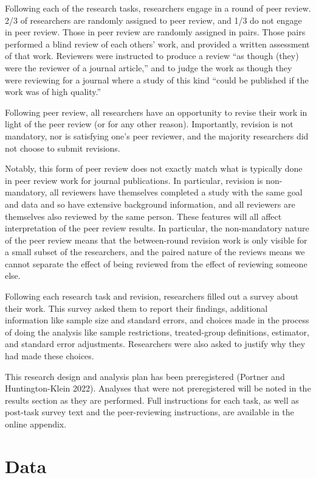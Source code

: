\documentclass[
  letterpaper,
  DIV=11,
  numbers=noendperiod]{scrartcl}
\begin{document}
Following each of the research tasks, researchers engage in a round of
peer review. 2/3 of researchers are randomly assigned to peer review,
and 1/3 do not engage in peer review. Those in peer review are randomly
assigned in pairs. Those pairs performed a blind review of each others'
work, and provided a written assessment of that work. Reviewers were
instructed to produce a review ``as though (they) were the reviewer of a
journal article,'' and to judge the work as though they were reviewing
for a journal where a study of this kind ``could be published if the
work was of high quality.''

Following peer review, all researchers have an opportunity to revise
their work in light of the peer review (or for any other reason).
Importantly, revision is not mandatory, nor is satisfying one's peer
reviewer, and the majority researchers did not choose to submit
revisions.

Notably, this form of peer review does not exactly match what is
typically done in peer review work for journal publications. In
particular, revision is non-mandatory, all reviewers have themselves
completed a study with the same goal and data and so have extensive
background information, and all reviewers are themselves also reviewed
by the same person. These features will all affect interpretation of the
peer review results. In particular, the non-mandatory nature of the peer
review means that the between-round revision work is only visible for a
small subset of the researchers, and the paired nature of the reviews
means we cannot separate the effect of being reviewed from the effect of
reviewing someone else.

Following each research task and revision, researchers filled out a
survey about their work. This survey asked them to report their
findings, additional information like sample size and standard errors,
and choices made in the process of doing the analysis like sample
restrictions, treated-group definitions, estimator, and standard error
adjustments. Researchers were also asked to justify why they had made
these choices.

This research design and analysis plan has been preregistered (Portner
and Huntington-Klein 2022). Analyses that were not preregistered will be
noted in the results section as they are performed. Full instructions
for each task, as well as post-task survey text and the peer-reviewing
instructions, are available in the online appendix.

\hypertarget{data}{%
\section{Data}\label{data}}
\end{document}
